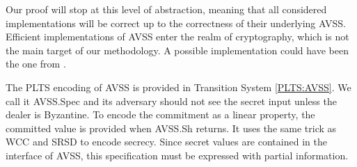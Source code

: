 Our proof will stop at this level of abstraction, meaning that all considered
implementations will be correct up to the correctness of their underlying \textsf{AVSS}.
Efficient implementations of \textsf{AVSS} enter the realm of cryptography, which
is not the main target of our methodology. A possible implementation could have
been the one from \cite{Canetti1993Fast}.

\begin{specification}
    \label{AVSS:Spec}

    The PLTS encoding of \textsf{AVSS} is provided in Transition System \ref{PLTS:AVSS}.
    We call it \textsf{AVSS.Spec} and its adversary should not see the secret
    input unless the dealer is Byzantine.
    To encode the commitment as a linear property, the committed value is provided
    when \textsf{AVSS.Sh} returns.
    It uses the same trick as \textsf{WCC} and \textsf{SRSD} to encode secrecy.
    Since secret values are contained in the interface of \textsf{AVSS}, this
    specification must be expressed with partial information.
\end{specification}
